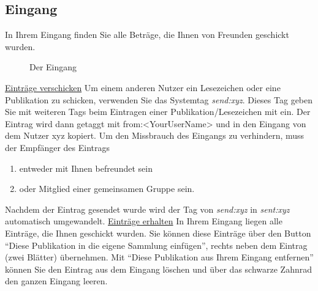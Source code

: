 \begin{description}
\subsection{Eingang}
In Ihrem Eingang finden Sie alle Beträge, die Ihnen von Freunden geschickt wurden.
\begin{figure}[h!]
 \centering
 \caption{Der Eingang}
 \label{figure034}
\end{figure}
\underline{Einträge verschicken}
\newline
Um einem anderen Nutzer ein Lesezeichen oder eine Publikation zu schicken, verwenden Sie das Systemtag \textit{send:xyz}. Dieses Tag geben Sie mit weiteren Tags beim Eintragen einer Publikation/Lesezeichen mit ein. Der Eintrag wird dann getaggt mit from:<YourUserName> und in den Eingang von dem Nutzer xyz kopiert. Um den Missbrauch des Eingangs zu verhindern, muss der Empfänger des Eintrags
\begin{enumerate}
    \item entweder mit Ihnen befreundet sein
    \item oder Mitglied einer gemeinsamen Gruppe sein.
\end{enumerate}
Nachdem der Eintrag gesendet wurde wird der Tag von \textit{send:xyz} in \textit{sent:xyz} automatisch umgewandelt.
\newline
\newline
\underline{Einträge erhalten}
\newline
In Ihrem Eingang liegen alle Einträge, die Ihnen geschickt wurden. Sie können diese Einträge über den Button \enquote{Diese Publikation in die eigene Sammlung einfügen}, rechts neben dem Eintrag (zwei Blätter) übernehmen. Mit \enquote{Diese Publikation aus Ihrem Eingang entfernen} können Sie den Eintrag aus dem Eingang löschen und über das schwarze Zahnrad den ganzen Eingang leeren.

\end{description}
